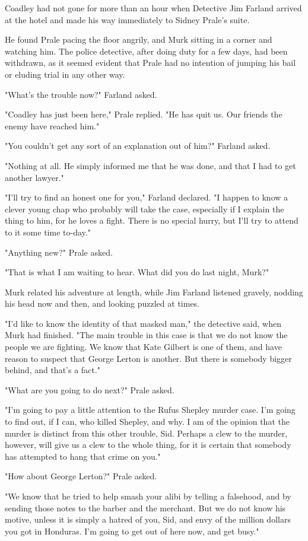 \documentclass{novel}
\begin{document}
Coadley had not gone for more than an hour when Detective Jim Farland arrived at the hotel and made his way immediately to Sidney Prale's suite.

He found Prale pacing the floor angrily, and Murk sitting in a corner and watching him. The police detective, after doing duty for a few days, had been withdrawn, as it seemed evident that Prale had no intention of jumping his bail or eluding trial in any other way.

"What's the trouble now?" Farland asked.

"Coadley has just been here," Prale replied. "He has quit us. Our friends the enemy have reached him."

"You couldn't get any sort of an explanation out of him?" Farland asked.

"Nothing at all. He simply informed me that he was done, and that I had to get another lawyer."

"I'll try to find an honest one for you," Farland declared. "I happen to know a clever young chap who probably will take the case, especially if I explain the thing to him, for he loves a fight. There is no special hurry, but I'll try to attend to it some time to-day."

"Anything new?" Prale asked.

"That is what I am waiting to hear. What did you do last night, Murk?"

Murk related his adventure at length, while Jim Farland listened gravely, nodding his head now and then, and looking puzzled at times.

"I'd like to know the identity of that masked man," the detective said, when Murk had finished. "The main trouble in this case is that we do not know the people we are fighting. We know that Kate Gilbert is one of them, and have reason to suspect that George Lerton is another. But there is somebody bigger behind, and that's a fact."

"What are you going to do next?" Prale asked.

"I'm going to pay a little attention to the Rufus Shepley murder case. I'm going to find out, if I can, who killed Shepley, and why. I am of the opinion that the murder is distinct from this other trouble, Sid. Perhaps a clew to the murder, however, will give us a clew to the whole thing, for it is certain that somebody has attempted to hang that crime on you."

"How about George Lerton?" Prale asked.

"We know that he tried to help smash your alibi by telling a falsehood, and by sending those notes to the barber and the merchant. But we do not know his motive, unless it is simply a hatred of you, Sid, and envy of the million dollars you got in Honduras. I'm going to get out of here now, and get busy."
\end{document}
